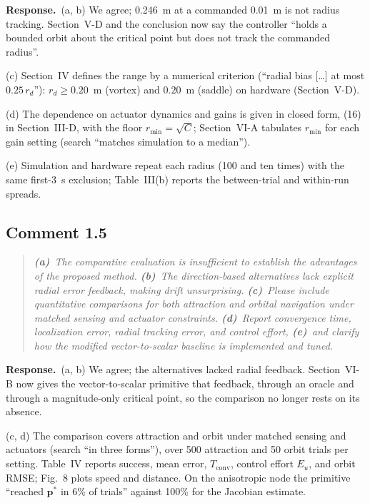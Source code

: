\documentclass[10pt]{article}
\newcommand{\rev}[1]{#1}                             %
\newcommand{\resp}{\par\textbf{Response.}~}
\begin{document}
\resp (a, b) We agree; 0.246~m at a commanded 0.01~m is not radius tracking. Section~V-D and the conclusion now say the controller ``holds a bounded orbit about the critical point but does not track the commanded radius''.

(c) Section~IV defines the range by a numerical criterion (``radial bias [\ldots] at most $0.25\,r_d$''): $r_d \ge \rev{0.20}$~m (vortex) and $\rev{0.20}$~m (saddle) on hardware (Section~V-D).

(d) The dependence on actuator dynamics and gains is given in closed form, (16) in Section~III-D, with the floor $r_{\min} = \sqrt{C}$; Section~VI-A tabulates $r_{\min}$ for each gain setting (search ``matches simulation to a median'').

(e) Simulation and hardware repeat each radius (\rev{100} and \rev{ten} times) with the same first-\rev{3}~s exclusion; Table~III(b) reports the between-trial and within-run spreads.

\subsection*{Comment 1.5}

\begin{quote}\itshape
\textbf{(a)}~The comparative evaluation is insufficient to establish the advantages of the proposed method.
\textbf{(b)}~The direction-based alternatives lack explicit radial error feedback, making drift unsurprising.
\textbf{(c)}~Please include quantitative comparisons for both attraction and orbital navigation under matched sensing and actuator constraints.
\textbf{(d)}~Report convergence time, localization error, radial tracking error, and control effort,
\textbf{(e)}~and clarify how the modified vector-to-scalar baseline is implemented and tuned.
\end{quote}

\resp (a, b) We agree; the alternatives lacked radial feedback. Section~VI-B now gives the vector-to-scalar primitive that feedback, through an oracle and through a magnitude-only critical point, so the comparison no longer rests on its absence.

(c, d) The comparison covers attraction and orbit under matched sensing and actuators (search ``in three forms''), over \rev{500} attraction and \rev{50} orbit trials per setting. Table~IV reports success, mean error, $T_{\mathrm{conv}}$, control effort $E_u$, and orbit RMSE; Fig.~8 plots speed and distance. On the anisotropic node the primitive ``reached $\mathbf{p}^*$ in \rev{6}\% of trials'' against 100\% for the Jacobian estimate.
\end{document}
